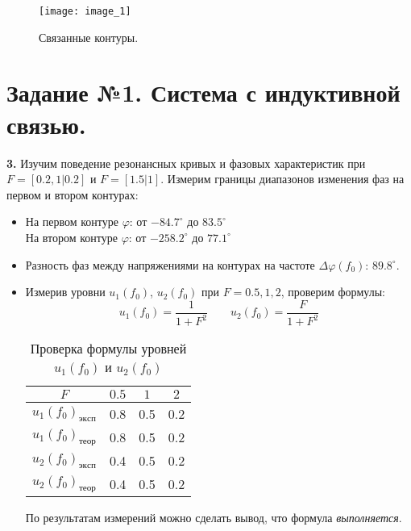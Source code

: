 






\newpage

\begin{figure}[H]
	\centering
	\texttt{[image: image\_1]}
	\caption{Связанные контуры.}
\end{figure}

\section*{Задание №1. Система с индуктивной связью.}

\textbf{3.} Изучим поведение резонансных кривых и фазовых характеристик при $F = [0.2, 1|0.2]$ и $F = [1.5|1]$. Измерим границы диапазонов изменения фаз на первом и втором контурах: 
\begin{itemize}
\item На первом контуре $ \varphi $:   от $-84.7^{\circ}$ до $83.5^{\circ}$ \\
		На втором контуре $ \varphi $: от $-258.2^{\circ}$ до $77.1^{\circ}$ 
\item Разность фаз между напряжениями на контурах на частоте $\Delta \varphi (f_0)$: $89.8^{\circ}$.

\item Измерив уровни $u_1(f_0)$, $u_2(f_0)$ при $F = 0.5, 1, 2$, проверим формулы:
\begin{equation}
	\label{f1}
	u_1(f_0) = \frac{1}{1+F^2} \quad \quad u_2(f_0)= \frac{F}{1+F^2}
\end{equation}

\begin{table}[H]
	\centering
	\begin{tabular}{|c|c|c|c|} \hline
		$F$                         & $0.5$ & $1$ & $2$ \\ \hline
		$u_1(f_0)_{эксп}$          & 0.8 & 0.5   & 0.2 \\ \hline
		$u_1(f_0)_{теор}$ & 0.8 & 0.5   & 0.2 \\ \hline
		$u_2(f_0)_{эксп}$          & 0.4 & 0.5   & 0.2 \\ \hline
		$u_2(f_0)_{теор}$ & 0.4 & 0.5   & 0.2 \\ \hline
	\end{tabular}
	\caption{Проверка формулы уровней $ u_1(f_0) $ и $ u_2(f_0) $}
\end{table}

По результатам измерений можно сделать вывод, что формула \textit{выполняется}.

\end{itemize}
